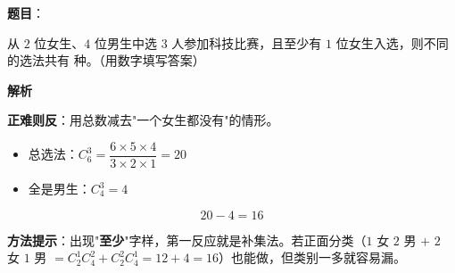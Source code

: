 \begin{answer}

\textbf{题目}：

从 $2$ 位女生、$4$ 位男生中选 $3$ 人参加科技比赛，且至少有 $1$ 位女生入选，则不同的选法共有 \gkblank{} 种。（用数字填写答案）

\textbf{解析}

\textbf{正难则反}：用总数减去"一个女生都没有"的情形。

\begin{itemize}
\item 总选法：$C_6^{3}=\dfrac{6\times5\times4}{3\times2\times1}=20$
\item 全是男生：$C_4^{3}=4$
\end{itemize}

\nopagebreak[4]
\[20-4=16\]

\begin{gktip}
\textbf{方法提示}：出现"\textbf{至少}"字样，第一反应就是补集法。若正面分类（$1$ 女 $2$ 男 $+$ $2$ 女 $1$ 男 $=C_2^{1}C_4^{2}+C_2^{2}C_4^{1}=12+4=16$）也能做，但类别一多就容易漏。
\end{gktip}


\par\medskip

\end{answer}
